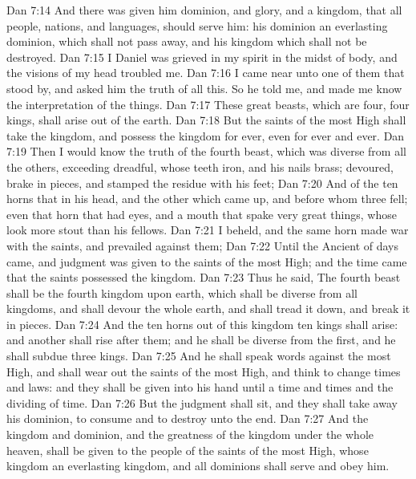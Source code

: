 \vs Dan 7:14 And there was given him dominion, and glory, and a kingdom, that all people, nations, and languages, should serve him: his dominion  an everlasting dominion, which shall not pass away, and his kingdom  which shall not be destroyed.
\vs Dan 7:15 I Daniel was grieved in my spirit in the midst of  body, and the visions of my head troubled me.
\vs Dan 7:16 I came near unto one of them that stood by, and asked him the truth of all this. So he told me, and made me know the interpretation of the things.
\vs Dan 7:17 These great beasts, which are four,  four kings,  shall arise out of the earth.
\vs Dan 7:18 But the saints of the most High shall take the kingdom, and possess the kingdom for ever, even for ever and ever.
\vs Dan 7:19 Then I would know the truth of the fourth beast, which was diverse from all the others, exceeding dreadful, whose teeth  iron, and his nails  brass;  devoured, brake in pieces, and stamped the residue with his feet;
\vs Dan 7:20 And of the ten horns that  in his head, and  the other which came up, and before whom three fell; even  that horn that had eyes, and a mouth that spake very great things, whose look  more stout than his fellows.
\vs Dan 7:21 I beheld, and the same horn made war with the saints, and prevailed against them;
\vs Dan 7:22 Until the Ancient of days came, and judgment was given to the saints of the most High; and the time came that the saints possessed the kingdom.
\vs Dan 7:23 Thus he said, The fourth beast shall be the fourth kingdom upon earth, which shall be diverse from all kingdoms, and shall devour the whole earth, and shall tread it down, and break it in pieces.
\vs Dan 7:24 And the ten horns out of this kingdom  ten kings  shall arise: and another shall rise after them; and he shall be diverse from the first, and he shall subdue three kings.
\vs Dan 7:25 And he shall speak  words against the most High, and shall wear out the saints of the most High, and think to change times and laws: and they shall be given into his hand until a time and times and the dividing of time.
\vs Dan 7:26 But the judgment shall sit, and they shall take away his dominion, to consume and to destroy  unto the end.
\vs Dan 7:27 And the kingdom and dominion, and the greatness of the kingdom under the whole heaven, shall be given to the people of the saints of the most High, whose kingdom  an everlasting kingdom, and all dominions shall serve and obey him.
